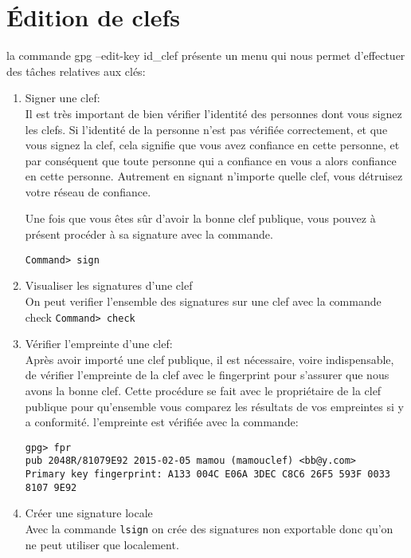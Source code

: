 \section{Édition de clefs}

la commande gpg --edit-key id\_clef 
présente un menu qui nous permet d’effectuer des tâches relatives aux clés:\\
\begin{enumerate}

\item Signer une clef:\\
Il est très important de bien vérifier l'identité des personnes dont vous signez les clefs. Si l'identité de la personne n'est pas 
vérifiée correctement, et que vous signez la clef, cela signifie que vous avez confiance en cette personne, et par conséquent que 
toute personne qui a confiance en vous a alors confiance en cette personne. Autrement en signant n'importe quelle clef, vous détruisez
votre réseau de confiance.

Une fois que vous êtes sûr d'avoir la bonne clef publique, vous pouvez à présent procéder à sa signature avec la commande.

\texttt{Command> sign}\\ 

\item Visualiser les signatures d'une clef\\
On peut verifier l'ensemble des signatures sur une clef avec la commande check
\texttt{Command> check }
\item Vérifier l'empreinte d'une clef:\\
Après avoir importé une clef publique, il est nécessaire, voire indispensable, de vérifier l'empreinte de la clef avec le fingerprint 
pour s'assurer que nous avons la bonne clef. Cette procédure se fait avec le propriétaire de la clef publique pour qu'ensemble vous 
comparez les résultats de vos empreintes si y a conformité. l'empreinte est vérifiée avec la commande:

\texttt{gpg> fpr\\
pub   2048R/81079E92 2015-02-05 mamou (mamouclef) <bb@y.com>\\
 Primary key fingerprint: A133 004C E06A 3DEC C8C6  26F5 593F 0033 8107 9E92} \\





\item Créer une signature locale\\
Avec la commande \texttt{lsign} on crée des signatures non exportable donc qu'on ne peut utiliser que localement.


\end{enumerate}
